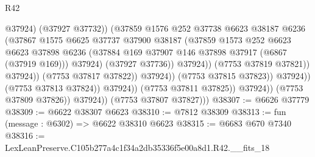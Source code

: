 \begin{lexlean}{R42}
\begin{coremodule}
{                                                  @37924)
                                                (@37927 @37732))
                                              (@37859
                                                @1576
                                                @252
                                                @37738
                                                @6623
                                                @38187
                                                @6236
                                                (@37867
                                                  @1575
                                                  @6625
                                                  @37737
                                                  @37900
                                                  @38187
                                                  (@37859
                                                    @1573
                                                    @252
                                                    @6623
                                                    @6623
                                                    @37898
                                                    @6236
                                                    (@37884
                                                      @169
                                                      @37907
                                                      @146
                                                      @37898
                                                      @37917
                                                      (@6867 (@37919 @169)))
                                                    @37924)
                                                  (@37927 @37736))
                                                @37924))
                                            (@7753 @37819 @37821))
                                          @37924))
                                      (@7753 @37817 @37822))
                                    @37924))
                                (@7753 @37815 @37823))
                              @37924))
                          (@7753 @37813 @37824))
                        @37924))
                    (@7753 @37811 @37825))
                  @37924))
              (@7753 @37809 @37826))
            @37924))
        (@7753 @37807 @37827)))
@38307 := @6626 @37779
@38309 := @6622 @38307 @6623
@38310 := @7812 @38309
@38313 := fun (message : @6302) => @6622 @38310 @6623
@38315 := @6683 @670 @7340
@38316 := LexLeanPreserve.C105b277a4c1f34a2db35336f5e00a8d1.R42.__fits_18
}
\end{coremodule}
\end{lexlean}
